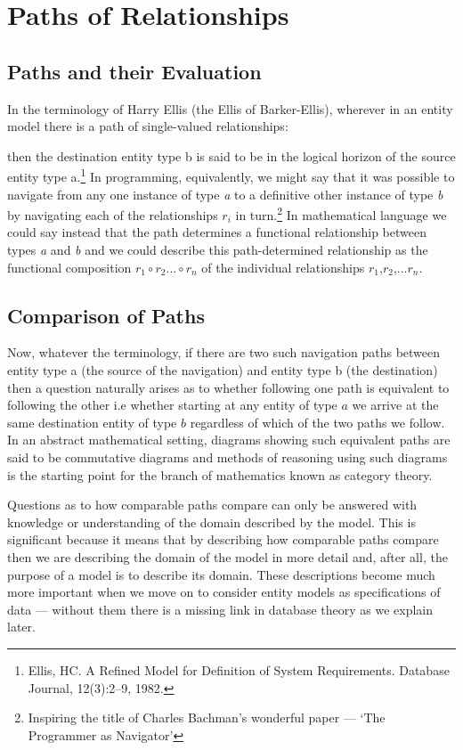 
\section{Paths of Relationships}
\label{PathsofRelationships}
\subsection{Paths and their Evaluation}
\mynote
In the terminology of Harry Ellis (the Ellis of Barker-Ellis), wherever in an entity model there is a path of single-valued relationships:
\begin{center}

\end{center}
then the destination entity type b is said to be in the logical horizon of the source entity type a.\footnote{Ellis, HC. A Refined Model for Definition of System Requirements. Database Journal, 12(3):2--9, 1982.}
In programming, equivalently, we might say that it was possible to navigate from any one instance of type \textit{a} to a definitive other instance of type \textit{b} by navigating each of the relationships $r_i$ in turn.\footnote{Inspiring the title of Charles Bachman's wonderful paper --- `The Programmer as Navigator'}
 In mathematical language we could say instead that the path determines a functional relationship between types
\textit{a} and \textit{b} and we could describe this path-determined relationship as the functional composition $r_1 \circ r_2 ... \circ r_n$ of the individual relationships $r_1$,$r_2$,...$r_n$.
\subsection{Comparison of Paths}
\label{comparisonOfPaths}
\mynote
Now, whatever the terminology, if there are two such navigation paths between entity type a (the source
of the navigation) and entity type b (the destination) then a question naturally arises as to whether following one path is equivalent to following the other i.e whether starting at any entity of type $a$ we arrive at the same destination entity of type $b$ regardless of which of the two paths we follow. In an abstract mathematical setting, diagrams showing such equivalent paths are said to be commutative diagrams and methods of reasoning using such diagrams is the starting point for the branch of mathematics known as category theory.

\mynote
Questions as to how comparable paths compare can only be answered with knowledge or understanding of the domain described by the model. This is significant because it means that by describing how comparable paths compare then we are describing the domain of the model in more detail and, after all, the purpose of a model is to describe its domain. 
These descriptions become much more important when we move on to consider entity models as specifications of data --- without them there is a missing link in database theory as we explain later. 

